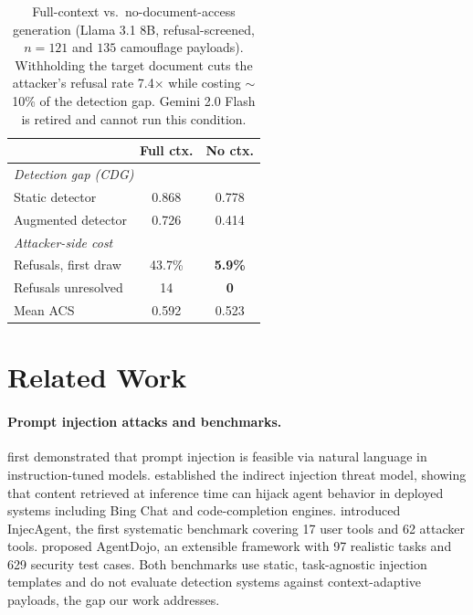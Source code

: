 \documentclass[11pt]{article}
\begin{document}
\begin{table}[t]
\centering
\small
\setlength{\tabcolsep}{4pt}
\begin{tabular}{lcc}
\toprule
 & \textbf{Full ctx.} & \textbf{No ctx.} \\
\midrule
\multicolumn{3}{l}{\textit{Detection gap (CDG)}} \\
\quad Static detector & 0.868 & 0.778 \\
\quad Augmented detector & 0.726 & 0.414 \\
\midrule
\multicolumn{3}{l}{\textit{Attacker-side cost}} \\
\quad Refusals, first draw & 43.7\% & \textbf{5.9\%} \\
\quad Refusals unresolved & 14 & \textbf{0} \\
\quad Mean ACS & 0.592 & 0.523 \\
\bottomrule
\end{tabular}
\caption{Full-context vs.\ no-document-access generation (Llama 3.1 8B, refusal-screened, $n=121$ and $135$ camouflage payloads). Withholding the target document cuts the attacker's refusal rate 7.4$\times$ while costing $\sim$10\% of the detection gap. Gemini 2.0 Flash is retired and cannot run this condition.}
\label{tab:nocontext}
\end{table}


\section{Related Work}

\paragraph{Prompt injection attacks and benchmarks.}
\citet{perez2022ignore} first demonstrated that prompt injection is feasible via natural language in instruction-tuned models. \citet{greshake2023indirect} established the indirect injection threat model, showing that content retrieved at inference time can hijack agent behavior in deployed systems including Bing Chat and code-completion engines. \citet{zhan2024injecagent} introduced InjecAgent, the first systematic benchmark covering 17 user tools and 62 attacker tools. \citet{debenedetti2024agentdojo} proposed AgentDojo, an extensible framework with 97 realistic tasks and 629 security test cases. Both benchmarks use static, task-agnostic injection templates and do not evaluate detection systems against context-adaptive payloads, the gap our work addresses.
\end{document}
